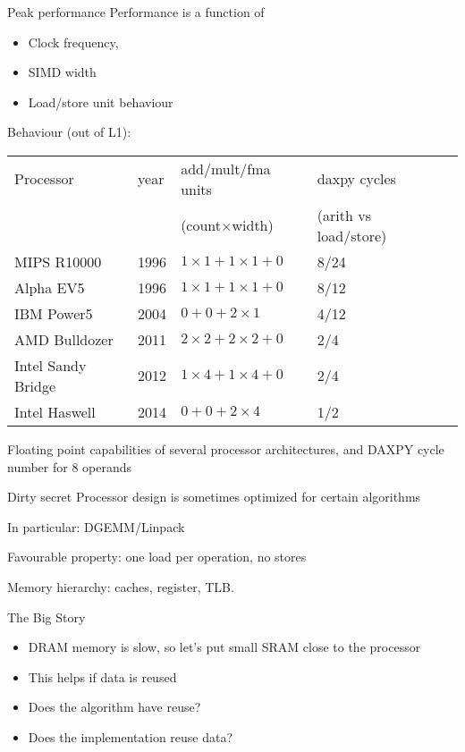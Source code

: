 \begin{frame}{Peak performance}
\small
Performance is a function of
\begin{itemize}
\item Clock frequency,
\item SIMD width
\item Load/store unit behaviour
\end{itemize}
Behaviour (out of L1):

  \begin{tabular}{lllll}
Processor&year&add/mult/fma units  &daxpy cycles\\
         &    &(count$\times$width)&(arith vs load/store)\\
\toprule
MIPS R10000       &1996 &$1\times1+1\times1+0$ &8/24 \\
Alpha EV5         &1996 &$1\times1+1\times1+0$ &8/12 \\
IBM Power5        &2004 &$0+0+2\times1       $ &4/12 \\
AMD Bulldozer     &2011 &$2\times2+2\times2+0$ &2/4  \\
Intel Sandy Bridge&2012 &$1\times4+1\times4+0$ &2/4  \\
Intel Haswell     &2014 &$0+0+2\times 4      $ &1/2  \\
  \end{tabular}

Floating point capabilities of several processor architectures,
  and DAXPY cycle number for 8 operands  
\end{frame}

\begin{frame}{Dirty secret}
  Processor design is sometimes optimized for certain algorithms

  In particular: DGEMM/Linpack

  Favourable property: one load per operation, no stores
\end{frame}

 {Memory hierarchy: caches, register, TLB.}

\begin{frame}{The Big Story}
  \begin{itemize}
  \item DRAM memory is slow, so let's put small SRAM close to the processor
  \item This helps if data is reused 
  \item Does the algorithm have reuse?
  \item Does the implementation reuse data?
  \end{itemize}
\end{frame}

